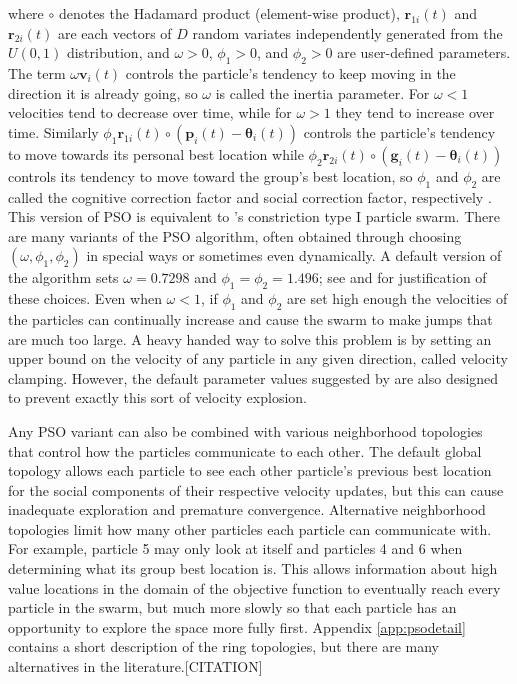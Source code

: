 \documentclass[12pt]{article}
\begin{document}
where $\circ$ denotes the Hadamard product (element-wise product), $\bm{r}_{1i}(t)$ and $\bm{r}_{2i}(t)$ are each vectors of $D$ random variates independently generated from the $U(0,1)$ distribution, and $\omega>0$, $\phi_1>0$, and $\phi_2>0$ are user-defined parameters. The term $\omega \bm{v}_i(t)$ controls the particle's tendency to keep moving in the direction it is already going, so $\omega$ is called the inertia parameter. For $\omega<1$ velocities tend to decrease over time, while for $\omega>1$ they tend to increase over time. Similarly $\phi_1 \bm{r}_{1i}(t)\circ(\bm{p}_i(t) - \bm{\theta}_i(t))$ controls the particle's tendency to move towards its personal best location while $\phi_2 \bm{r}_{2i}(t)\circ(\bm{g}_i(t) - \bm{\theta}_i(t))$ controls its tendency to move toward the group's best location, so $\phi_1$ and $\phi_2$ are called the cognitive correction factor and social correction factor, respectively \citep{blum2008swarm}. This version of PSO is equivalent to \citet{clerc2002particle}'s constriction type I particle swarm. There are many variants of the PSO algorithm, often obtained through choosing $(\omega,\phi_1,\phi_2)$ in special ways or sometimes even dynamically. A default version of the algorithm sets $\omega = 0.7298$ and $\phi_1 = \phi_2 = 1.496$; see \citet{clerc2002particle} and \citet{blum2008swarm} for justification of these choices. Even when $\omega<1$, if $\phi_1$ and $\phi_2$ are set high enough the velocities of the particles can continually increase and cause the swarm to make jumps that are much too large. A heavy handed way to solve this problem is by setting an upper bound on the velocity of any particle in any given direction, called velocity clamping. However, the default parameter values suggested by \citet{clerc2002particle} are also designed to prevent exactly this sort of velocity explosion.

Any PSO variant can also be combined with various neighborhood topologies that control how the particles communicate to each other. The default global topology allows each particle to see each other particle's previous best location for the social components of their respective velocity updates, but this can cause inadequate exploration and premature convergence. Alternative neighborhood topologies limit how many other particles each particle can communicate with. For example, particle 5 may only look at itself and particles 4 and 6 when determining what its group best location is. This allows information about high value locations in the domain of the objective function to eventually reach every particle in the swarm, but much more slowly so that each particle has an opportunity to explore the space more fully first. Appendix \ref{app:psodetail} contains a short description of the ring topologies, but there are many alternatives in the literature.[CITATION]
\end{document}
